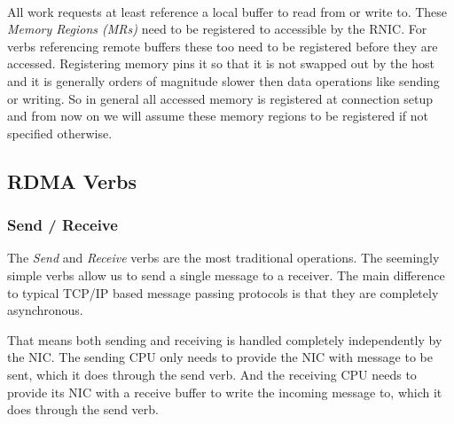 \paragraph{} All work requests at least reference a local buffer to read from or write to. These 
\emph{Memory Regions (MRs)} need to be registered to accessible by the RNIC. For verbs referencing remote buffers these
too need to be registered before they are accessed. 
Registering memory pins it so that it is not swapped out by the host and it is generally orders of magnitude slower 
then data operations like sending or writing. So in general all accessed memory is registered at connection setup and from 
now on we will assume these memory regions to be registered if not specified otherwise.



\subsection{RDMA Verbs}\label{sec:bg:verbs}

\subsubsection{Send / Receive} \label{sec:bg:send}
The \emph{Send} and \emph{Receive} verbs are the most traditional operations. The seemingly simple verbs allow 
us to send a single message to  a receiver. The main difference to typical TCP/IP based message passing protocols is that
they are completely asynchronous.

That means both sending and receiving is handled completely independently by the NIC. The sending CPU only needs to provide
the NIC with message to be sent, which it does through the send verb. And the receiving CPU needs to provide its NIC with 
a receive buffer to write the incoming message to, which it does through the send verb.




